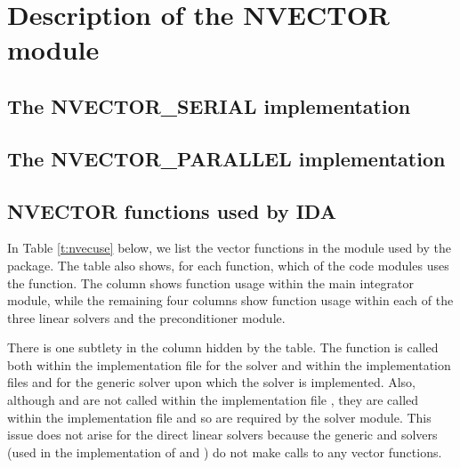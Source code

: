 \chapter{Description of the NVECTOR module}\label{s:nvector}


\section{The NVECTOR\_SERIAL implementation}\label{ss:nvec_ser}


\section{The NVECTOR\_PARALLEL implementation}\label{ss:nvec_par}


\section{NVECTOR functions used by IDA}

In Table \ref{t:nvecuse} below, we list the vector functions in the 
{\nvector} module used by the {\ida} package.
The table also shows, for each function, which of the code modules uses
the function. The {\ida} column shows function usage within the main
integrator module, while the remaining four columns show function usage
within each of the three {\ida} linear solvers and the {\idabbdpre}
preconditioner module. 

There is one subtlety in the {\idaspgmr} column hidden by the table. 
The  function is called both within the 
implementation file  for the {\idaspgmr} solver and within
the implementation files  and  for the generic
{\spgmr} solver upon which the {\idaspgmr} solver is implemented. Also, although
 and  are not called within the implementation file
, they are called within the implementation file
 and so are required by the {\idaspgmr} solver module.
This issue does not arise for the direct {\ida} linear solvers because
the generic {\dense} and {\band} solvers (used in the implementation of
{\idadense} and {\idaband}) do not make calls to any vector functions.

